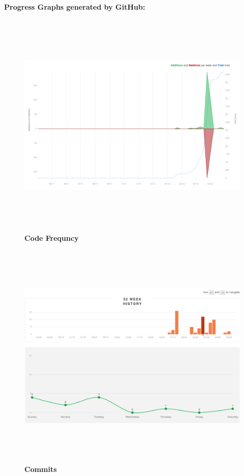 \newpage
\textbf{Progress Graphs generated by GitHub:}\\
\begin{figure}[H]
  \centering
    \includegraphics[height= 11cm, width=17cm]{project/images/GitHub/code-freq}
  \caption{\textbf{Code Frequncy}}
\end{figure}
\begin{figure}[H]
  \centering
    \includegraphics[height= 11cm, width=17cm]{project/images/GitHub/commits}
  \caption{\textbf{Commits}}
\end{figure}
